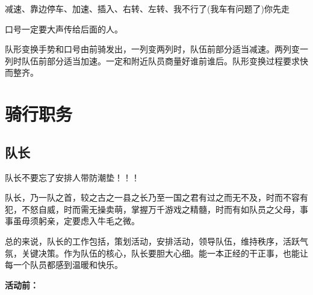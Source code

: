 \documentclass{ctexbook}
\begin{document}
减速、靠边停车、加速、插入、右转、左转、我不行了(我车有问题了)你先走

口号一定要大声传给后面的人。

队形变换手势和口号由前骑发出，一列变两列时，队伍前部分适当减速。两列变一列时队伍前部分适当加速。一定和附近队员商量好谁前谁后。队形变换过程要求快而整齐。
\section{骑行职务}
\subsection{队长}
队长不要忘了安排人带防潮垫！！！


队长，乃一队之首，较之古之一县之长乃至一国之君有过之而无不及，时而不容有犯，不怒自威，时而需无操卖萌，掌握万千游戏之精髓，时而有如队员之父母，事事虽毋须躬亲，定要虑入牛毛之微。

总的来说，队长的工作包括，策划活动，安排活动，领导队伍，维持秩序，活跃气氛，关键决策。作为队伍的核心，队长要胆大心细。能一本正经的干正事，也能让每一个队员都感到温暖和快乐。

\textbf{活动前：}
\end{document}
